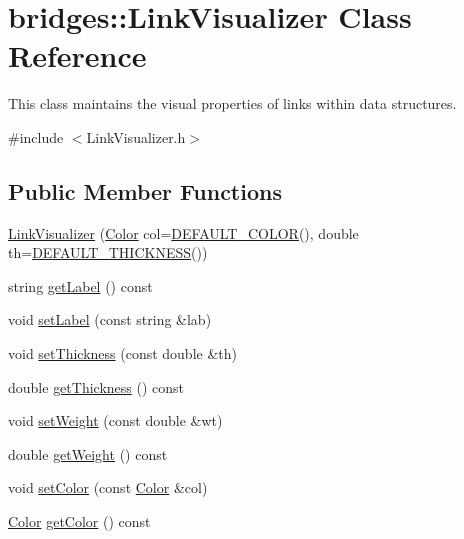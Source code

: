 \hypertarget{classbridges_1_1_link_visualizer}{}\section{bridges\+:\+:Link\+Visualizer Class Reference}
\label{classbridges_1_1_link_visualizer}


This class maintains the visual properties of links within data structures.  




{\ttfamily \#include $<$Link\+Visualizer.\+h$>$}

\subsection*{Public Member Functions}
\begin{DoxyCompactItemize}
\item 
\hyperlink{classbridges_1_1_link_visualizer_a69a84adf2b85773120d3f6afd938488e}{Link\+Visualizer} (\hyperlink{classbridges_1_1_color}{Color} col=\hyperlink{classbridges_1_1_link_visualizer_a5e121c52fc270337c58413d0fd72cf58}{D\+E\+F\+A\+U\+L\+T\+\_\+\+C\+O\+L\+O\+R}(), double th=\hyperlink{classbridges_1_1_link_visualizer_a6d05e052d64964d876f557901635079d}{D\+E\+F\+A\+U\+L\+T\+\_\+\+T\+H\+I\+C\+K\+N\+E\+S\+S}())
\item 
string \hyperlink{classbridges_1_1_link_visualizer_a6fa07a948f842530c0bb8a13f6e0e84a}{get\+Label} () const 
\item 
void \hyperlink{classbridges_1_1_link_visualizer_a7e590ad57c51ef16a1d46e05ffdf1fb3}{set\+Label} (const string \&lab)
\item 
void \hyperlink{classbridges_1_1_link_visualizer_a92a88e0e4c2f0c8c68f33578743c6502}{set\+Thickness} (const double \&th)
\item 
double \hyperlink{classbridges_1_1_link_visualizer_a22513552576c20a13d6fd81348abb815}{get\+Thickness} () const 
\item 
void \hyperlink{classbridges_1_1_link_visualizer_a08b606d2451026a11e110d0b94f97538}{set\+Weight} (const double \&wt)
\item 
double \hyperlink{classbridges_1_1_link_visualizer_a82b0992294de2dad264c32b33f9a87b7}{get\+Weight} () const 
\item 
void \hyperlink{classbridges_1_1_link_visualizer_adedc1f2b7d5d562b115ef9d8ae19fa73}{set\+Color} (const \hyperlink{classbridges_1_1_color}{Color} \&col)
\item 
\hyperlink{classbridges_1_1_color}{Color} \hyperlink{classbridges_1_1_link_visualizer_a4b244bde324fc61c262954e590db20a6}{get\+Color} () const 
\end{DoxyCompactItemize}
